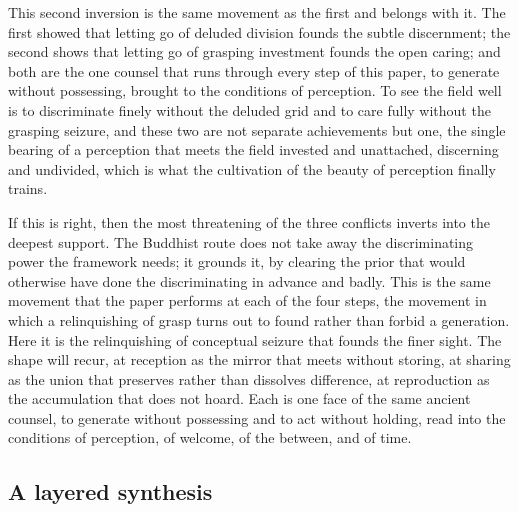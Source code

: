 This second inversion is the same movement as the first and belongs with it. The first showed that letting go of deluded division founds the subtle discernment; the second shows that letting go of grasping investment founds the open caring; and both are the one counsel that runs through every step of this paper, to generate without possessing, brought to the conditions of perception. To see the field well is to discriminate finely without the deluded grid and to care fully without the grasping seizure, and these two are not separate achievements but one, the single bearing of a perception that meets the field invested and unattached, discerning and undivided, which is what the cultivation of the beauty of perception finally trains.

If this is right, then the most threatening of the three conflicts inverts into the deepest support. The Buddhist route does not take away the discriminating power the framework needs; it grounds it, by clearing the prior that would otherwise have done the discriminating in advance and badly. This is the same movement that the paper performs at each of the four steps, the movement in which a relinquishing of grasp turns out to found rather than forbid a generation. Here it is the relinquishing of conceptual seizure that founds the finer sight. The shape will recur, at reception as the mirror that meets without storing, at sharing as the union that preserves rather than dissolves difference, at reproduction as the accumulation that does not hoard. Each is one face of the same ancient counsel, to generate without possessing and to act without holding, read into the conditions of perception, of welcome, of the between, and of time.

\subsection{A layered synthesis}
\label{p22:sub:perception-synthesis}

